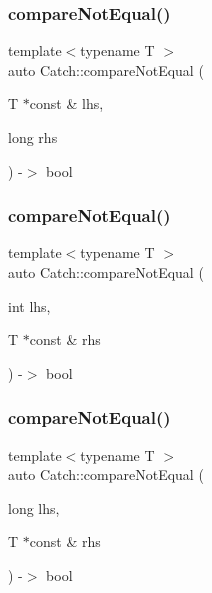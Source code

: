 \mbox{\label{namespace_catch_adad6539b3780b9a8953221efd038e2e4}} 
\subsubsection{compareNotEqual()\hspace{0.1cm}{\footnotesize\ttfamily [3/5]}}
{\footnotesize\ttfamily template$<$typename T $>$ \\
auto Catch\+::compare\+Not\+Equal (\begin{DoxyParamCaption}\item[{T $\ast$const \&}]{lhs,  }\item[{long}]{rhs }\end{DoxyParamCaption}) -\/$>$ bool }

\mbox{\label{namespace_catch_adb4b3e912b89a987025ca28cf0c92ba8}} 
\subsubsection{compareNotEqual()\hspace{0.1cm}{\footnotesize\ttfamily [4/5]}}
{\footnotesize\ttfamily template$<$typename T $>$ \\
auto Catch\+::compare\+Not\+Equal (\begin{DoxyParamCaption}\item[{int}]{lhs,  }\item[{T $\ast$const \&}]{rhs }\end{DoxyParamCaption}) -\/$>$ bool }

\mbox{\label{namespace_catch_a3db634a0adf44a1148767ba149ccf34d}} 
\subsubsection{compareNotEqual()\hspace{0.1cm}{\footnotesize\ttfamily [5/5]}}
{\footnotesize\ttfamily template$<$typename T $>$ \\
auto Catch\+::compare\+Not\+Equal (\begin{DoxyParamCaption}\item[{long}]{lhs,  }\item[{T $\ast$const \&}]{rhs }\end{DoxyParamCaption}) -\/$>$ bool }

